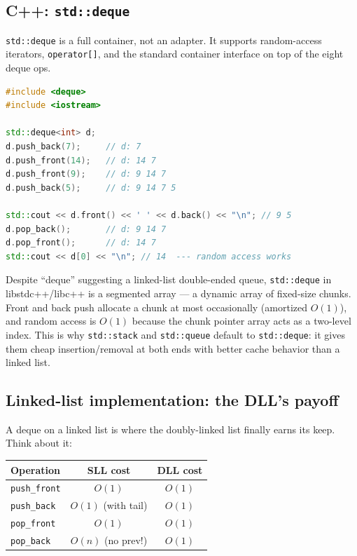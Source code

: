 \documentclass[11pt]{article}
\begin{document}
\subsection*{C++: \texttt{std::deque}}

\texttt{std::deque} is a full container, not an adapter. It
supports random-access iterators, \texttt{operator[]}, and the
standard container interface on top of the eight deque ops.

\begin{examplebox}
\begin{lstlisting}[language=C++,basicstyle=\ttfamily\small,frame=single]
#include <deque>
#include <iostream>

std::deque<int> d;
d.push_back(7);     // d: 7
d.push_front(14);   // d: 14 7
d.push_front(9);    // d: 9 14 7
d.push_back(5);     // d: 9 14 7 5

std::cout << d.front() << ' ' << d.back() << "\n"; // 9 5
d.pop_back();       // d: 9 14 7
d.pop_front();      // d: 14 7
std::cout << d[0] << "\n"; // 14  --- random access works
\end{lstlisting}
\end{examplebox}

\begin{notebox}
Despite ``deque'' suggesting a linked-list double-ended queue,
\texttt{std::deque} in libstdc++/libc++ is a segmented array
--- a dynamic array of fixed-size chunks. Front and back push
allocate a chunk at most occasionally (amortized $O(1)$), and
random access is $O(1)$ because the chunk pointer array acts as
a two-level index. This is why \texttt{std::stack} and
\texttt{std::queue} default to \texttt{std::deque}: it gives them
cheap insertion/removal at both ends with better cache behavior
than a linked list.
\end{notebox}

\subsection*{Linked-list implementation: the DLL's payoff}

A deque on a linked list is where the doubly-linked list finally
earns its keep. Think about it:

\begin{center}
\begin{tabular}{|l|c|c|}
\hline
\textbf{Operation} & \textbf{SLL cost} & \textbf{DLL cost} \\
\hline
\texttt{push\_front}  & $O(1)$ & $O(1)$ \\
\texttt{push\_back}   & $O(1)$ (with tail) & $O(1)$ \\
\texttt{pop\_front}   & $O(1)$ & $O(1)$ \\
\texttt{pop\_back}    & $O(n)$ (no prev!)  & $O(1)$ \\
\hline
\end{tabular}
\end{center}
\end{document}
